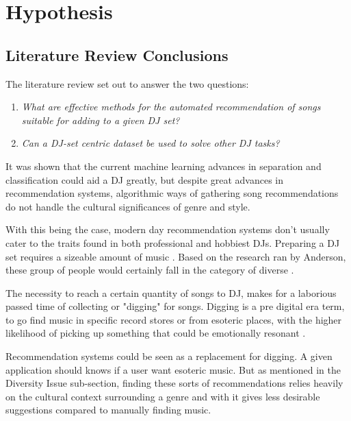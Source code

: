 
\graphicspath{{Chapter4/}}

\chapter{Hypothesis}

\section{Literature Review Conclusions}

The literature review set out to answer the two questions:
 
 \begin{enumerate}
 	\item \textit{What are effective methods for the automated recommendation of songs suitable for adding to a given DJ set?}
 	
 	\item \textit{Can a DJ-set centric dataset be used to solve other DJ tasks?}
	\end{enumerate}
 
 It was shown that the current machine learning advances in separation and classification could aid a DJ greatly, but despite great advances in recommendation systems, algorithmic ways of gathering song recommendations do not handle the cultural significances of genre and style.

With this being the case, modern day recommendation systems don't usually cater to the traits found in both professional and hobbiest DJs. Preparing a DJ set requires a sizeable amount of music \citep{allen_djs_2021}. Based on the research ran by Anderson, these group of people would certainly fall in the category of diverse \citep{anderson_algorithmic_2020}.

The necessity to reach a certain quantity of songs to DJ, makes for a laborious passed time of collecting or "digging" for songs. Digging is a pre digital era term, to go find music in specific record stores or from esoteric places, with the higher likelihood of picking up something that could be emotionally resonant \citep{allen_djs_2021}.

Recommendation systems could be seen as a replacement for digging. A given application should knows if a user want esoteric music. But as mentioned in the Diversity Issue sub-section, finding these sorts of recommendations relies heavily on the cultural context surrounding a genre and with it gives less desirable suggestions compared to manually finding music. 

